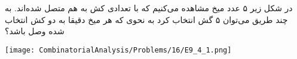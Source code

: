در شکل زیر ۵ عدد میخ مشاهده می‌کنیم که با تعدادی کش به هم متصل شده‌اند. به چند طریق می‌توان ۵ گش انتخاب کرد به نحوی که هر میخ دقیقا به دو کش انتخاب شده وصل باشد؟
\begin{center}
  \texttt{[image: CombinatorialAnalysis/Problems/16/E9\_4\_1.png]}
\end{center}